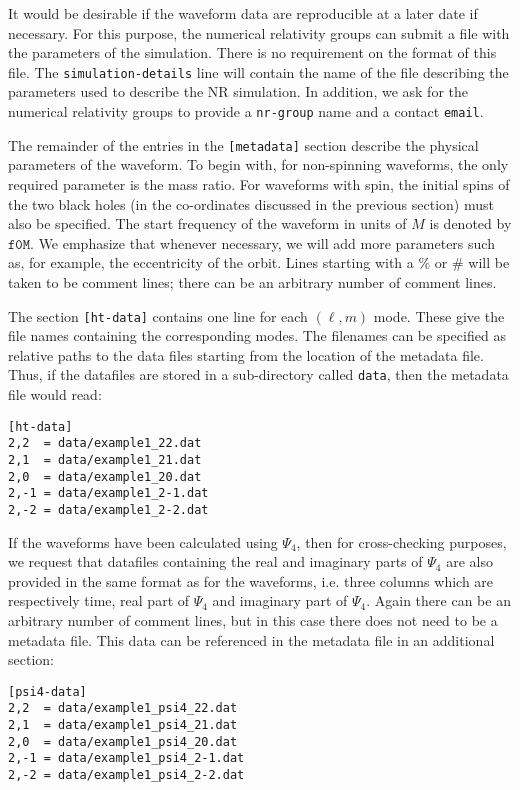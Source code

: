 \documentclass[prd,preprintnumbers,superscriptaddress,eqsecnum]{revtex4}
\numberwithin{equation}{section}
\begin{document}
It would be desirable if the waveform data are reproducible at a later
date if necessary. For this purpose, the numerical relativity groups
can submit a file with the parameters of the simulation. There is no
requirement on the format of this file. The
\texttt{simulation-details} line will contain the name of the file
describing the parameters used to describe the NR simulation. In
addition, we ask for the numerical relativity groups to provide a
\texttt{nr-group} name and a contact \texttt{email}.

The remainder of the entries in the \texttt{[metadata]} section
describe the physical parameters of the waveform. To begin with, for
non-spinning waveforms, the only required parameter is the mass ratio.
For waveforms with spin, the initial spins of the two black holes (in
the co-ordinates discussed in the previous section) must also be
specified.  The start frequency of the waveform in units of $M$ is
denoted by $\mathtt{f0M}$.  We emphasize that whenever necessary, we
will add more parameters such as, for example, the eccentricity of the
orbit. Lines starting with a $\%$ or $\#$ will be taken to be comment
lines; there can be an arbitrary number of comment lines.

The section \texttt{[ht-data]} contains one line for each $(\ell,m)$
mode. These give the file names containing the corresponding modes.
The filenames can be specified as relative paths to the data files
starting from the location of the metadata file. Thus, if the
datafiles are stored in a sub-directory called \texttt{data}, then the
metadata file would read:
\begin{verbatim}
[ht-data]
2,2  = data/example1_22.dat
2,1  = data/example1_21.dat
2,0  = data/example1_20.dat
2,-1 = data/example1_2-1.dat
2,-2 = data/example1_2-2.dat
\end{verbatim}

If the waveforms have been calculated using $\Psi_4$, then for
cross-checking purposes, we request that datafiles containing the real
and imaginary parts of $\Psi_4$ are also provided in the same format as
for the waveforms, i.e. three columns which are respectively time, real
part of $\Psi_4$ and imaginary part of $\Psi_4$. Again there can be an
arbitrary number of comment lines, but in this case there does not need
to be a metadata file. This data can be referenced in the metadata
file in an additional section:

\begin{verbatim}
[psi4-data]
2,2  = data/example1_psi4_22.dat
2,1  = data/example1_psi4_21.dat
2,0  = data/example1_psi4_20.dat
2,-1 = data/example1_psi4_2-1.dat
2,-2 = data/example1_psi4_2-2.dat
\end{verbatim}
\end{document}
